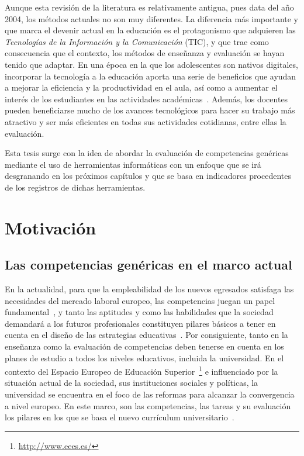 Aunque esta revisión de la literatura es relativamente antigua, pues data del año 2004, los métodos actuales no son muy diferentes. La diferencia más importante y que marca el devenir actual en la educación es el protagonismo que adquieren las \emph{Tecnologías de la Información y la Comunicación} (TIC), y que trae como consecuencia que el contexto, los métodos de enseñanza y evaluación se hayan tenido que adaptar. En una época en la que los adolescentes son nativos digitales, incorporar la tecnología a la educación aporta una serie de beneficios que ayudan a mejorar la eficiencia y la productividad en el aula, así como a aumentar el interés de los estudiantes en las actividades académicas~\cite{felipegarcia2015beneficios}. Además, los docentes pueden beneficiarse mucho de los avances tecnológicos para hacer su trabajo más atractivo y ser más eficientes en todas sus actividades cotidianas, entre ellas la evaluación. 

Esta tesis surge con la idea de abordar la evaluación de competencias genéricas mediante el uso de herramientas informáticas con un enfoque que se irá desgranando en los próximos capítulos y que se basa en indicadores procedentes de los registros de dichas herramientas.

\section{Motivación}
\label{sec:Motivation}

\subsection*{Las competencias genéricas en el marco actual}

En la actualidad, para que la empleabilidad de los nuevos egresados satisfaga las necesidades del mercado laboral europeo, las competencias juegan un papel fundamental~\cite{communique2012making}, y tanto las aptitudes y como las habilidades que la sociedad demandará a los futuros profesionales constituyen pilares básicos a tener en cuenta en el diseño de las estrategias educativas~\cite{de2010project}. Por consiguiente, tanto en la enseñanza como la evaluación de competencias deben tenerse en cuenta en los planes de estudio a todos los niveles educativos, incluida la universidad. En el contexto del Espacio Europeo de Educación Superior~\footnote{\url{http://www.eees.es/}} e influenciado por la situación actual de  la sociedad, sus instituciones sociales y políticas, la universidad se encuentra en el foco de las reformas para alcanzar la convergencia a nivel europeo. En este marco, son las competencias, las tareas y su evaluación los pilares en los que se basa el nuevo currículum universitario~\cite{zabala2005espacio}. 

